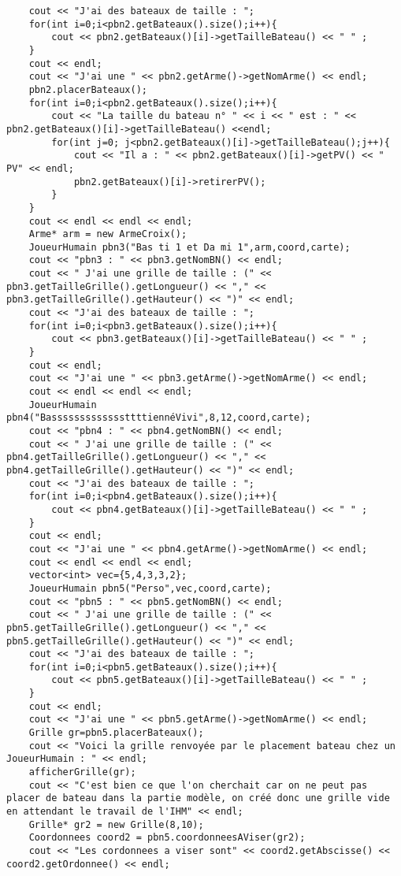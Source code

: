 \begin{lstlisting}
	cout << "J'ai des bateaux de taille : ";
	for(int i=0;i<pbn2.getBateaux().size();i++){
		cout << pbn2.getBateaux()[i]->getTailleBateau() << " " ;
	}
	cout << endl;
	cout << "J'ai une " << pbn2.getArme()->getNomArme() << endl;
	pbn2.placerBateaux();
	for(int i=0;i<pbn2.getBateaux().size();i++){
		cout << "La taille du bateau n° " << i << " est : " << pbn2.getBateaux()[i]->getTailleBateau() <<endl;
		for(int j=0; j<pbn2.getBateaux()[i]->getTailleBateau();j++){
			cout << "Il a : " << pbn2.getBateaux()[i]->getPV() << " PV" << endl;
			pbn2.getBateaux()[i]->retirerPV();
		}
	}
	cout << endl << endl << endl;
	Arme* arm = new ArmeCroix();
	JoueurHumain pbn3("Bas ti 1 et Da mi 1",arm,coord,carte);
	cout << "pbn3 : " << pbn3.getNomBN() << endl;
	cout << " J'ai une grille de taille : (" << pbn3.getTailleGrille().getLongueur() << "," << pbn3.getTailleGrille().getHauteur() << ")" << endl;
	cout << "J'ai des bateaux de taille : ";
	for(int i=0;i<pbn3.getBateaux().size();i++){
		cout << pbn3.getBateaux()[i]->getTailleBateau() << " " ;
	}
	cout << endl;
	cout << "J'ai une " << pbn3.getArme()->getNomArme() << endl;
	cout << endl << endl << endl;
	JoueurHumain pbn4("BasssssssssssssttttiennéVivi",8,12,coord,carte);
	cout << "pbn4 : " << pbn4.getNomBN() << endl;
	cout << " J'ai une grille de taille : (" << pbn4.getTailleGrille().getLongueur() << "," << pbn4.getTailleGrille().getHauteur() << ")" << endl;
	cout << "J'ai des bateaux de taille : ";
	for(int i=0;i<pbn4.getBateaux().size();i++){
		cout << pbn4.getBateaux()[i]->getTailleBateau() << " " ;
	}
	cout << endl;
	cout << "J'ai une " << pbn4.getArme()->getNomArme() << endl;
	cout << endl << endl << endl;
	vector<int> vec={5,4,3,3,2};
	JoueurHumain pbn5("Perso",vec,coord,carte);
	cout << "pbn5 : " << pbn5.getNomBN() << endl;
	cout << " J'ai une grille de taille : (" << pbn5.getTailleGrille().getLongueur() << "," << pbn5.getTailleGrille().getHauteur() << ")" << endl;
	cout << "J'ai des bateaux de taille : ";
	for(int i=0;i<pbn5.getBateaux().size();i++){
		cout << pbn5.getBateaux()[i]->getTailleBateau() << " " ;
	}
	cout << endl;
	cout << "J'ai une " << pbn5.getArme()->getNomArme() << endl;
	Grille gr=pbn5.placerBateaux();
	cout << "Voici la grille renvoyée par le placement bateau chez un JoueurHumain : " << endl;
	afficherGrille(gr);
	cout << "C'est bien ce que l'on cherchait car on ne peut pas placer de bateau dans la partie modèle, on créé donc une grille vide en attendant le travail de l'IHM" << endl;
	Grille* gr2 = new Grille(8,10);
	Coordonnees coord2 = pbn5.coordonneesAViser(gr2);
	cout << "Les cordonnees a viser sont" << coord2.getAbscisse() << coord2.getOrdonnee() << endl;

\end{lstlisting}
